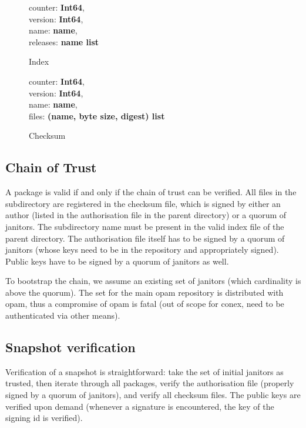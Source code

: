 \documentclass[nocopyrightspace]{sigplanconf}
\begin{document}
\begin{figure}
  \centering
  \begin{minipage}{\hsize}
    \begin{minipage}{.3 \hsize}
counter: \textbf{Int64},\\
version: \textbf{Int64},\\
name: \textbf{name},\\
releases: \textbf{name list}
 \caption{\label{fig:indexformat} Index}
    \end{minipage}
    \begin{minipage}{.55 \hsize}
counter: \textbf{Int64},\\
version: \textbf{Int64},\\
name: \textbf{name},\\
files: \textbf{(name, byte size, digest) list}
 \caption{\label{fig:checksumformat} Checksum}
    \end{minipage}
  \end{minipage}
\end{figure}

\subsection{Chain of Trust}
A package is valid if and only if the chain of trust can be verified.
All files in the subdirectory are registered in the checksum file, which is signed by either an author (listed in the authorisation file in the parent directory) or a quorum of janitors.
The subdirectory name must be present in the valid index file of the parent directory.
The authorisation file itself has to be signed by a quorum of janitors (whose keys need to be in the repository and appropriately signed).
Public keys have to be signed by a quorum of janitors as well.

To bootstrap the chain, we assume an existing set of janitors (which cardinality is above the quorum).
The set for the main opam repository is distributed with opam, thus a compromise of opam is fatal (out of scope for conex, need to be authenticated via other means).

\subsection{Snapshot verification}
Verification of a snapshot is straightforward: take the set of initial janitors as trusted, then iterate through all packages, verify the authorisation file (properly signed by a quorum of janitors), and verify all checksum files.
The public keys are verified upon demand (whenever a signature is encountered, the key of the signing id is verified).
\end{document}
